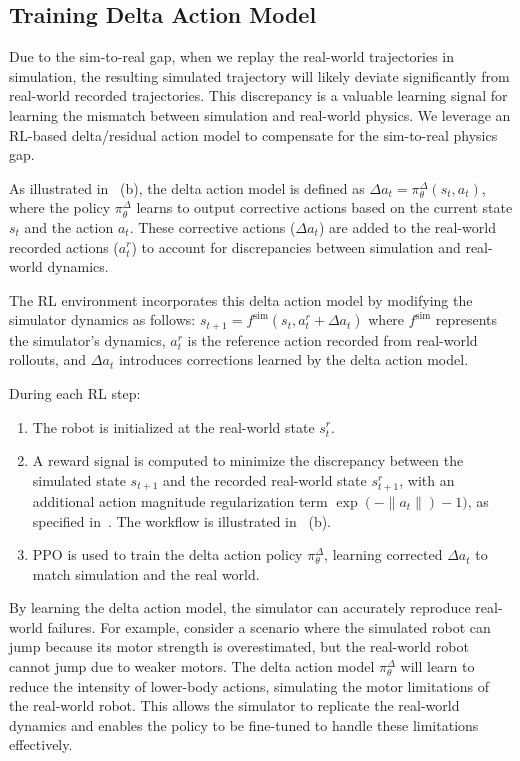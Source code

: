 \subsection{Training Delta Action Model}
\label{sec:train-delta-action-model}

Due to the sim-to-real gap, when we replay the real-world trajectories in simulation, the resulting simulated trajectory will likely deviate significantly from real-world recorded trajectories. This discrepancy is a valuable learning signal for learning the mismatch between simulation and real-world physics. We leverage an RL-based delta/residual action model to compensate for the sim-to-real physics gap.

As illustrated in~ (b), the delta action model is defined as $\Delta a_t = \pi^\Delta_\theta(s_t, a_t)$, where the policy $\pi^\Delta_\theta$ learns to output corrective actions based on the current state $s_t$ and the action $a_t$. These corrective actions ($\Delta a_t$) are added to the real-world recorded actions ($a^r_t$) to account for discrepancies between simulation and real-world dynamics.

The RL environment incorporates this delta action model by modifying the simulator dynamics as follows: $ s_{t+1} = f^\text{sim}(s_t, a^r_t + \Delta a_t)$ where $f^\text{sim}$ represents the simulator's dynamics, $a^r_t$ is the reference action recorded from real-world rollouts, and $\Delta a_t$ introduces corrections learned by the delta action model. 





During each RL step: 
\begin{enumerate}
    \item The robot is initialized at the real-world state $s^r_t$.
    \item  A reward signal is computed to minimize the discrepancy between the simulated state $s_{t+1}$ and the recorded real-world state $s^r_{t+1}$, with an additional action magnitude regularization term $\exp(-\lVert a_t \rVert) - 1)$, as specified in~. The workflow is illustrated in ~(b).
    \item PPO is used to train the delta action policy $\pi^\Delta_\theta$, learning corrected $\Delta a_t$ to match simulation and the real world.
\end{enumerate}



By learning the delta action model, the simulator can accurately reproduce real-world failures. For example, consider a scenario where the simulated robot can jump because its motor strength is overestimated, but the real-world robot cannot jump due to weaker motors. The delta action model $\pi^\Delta_\theta$ will learn to reduce the intensity of lower-body actions, simulating the motor limitations of the real-world robot. This allows the simulator to replicate the real-world dynamics and enables the policy to be fine-tuned to handle these limitations effectively.

